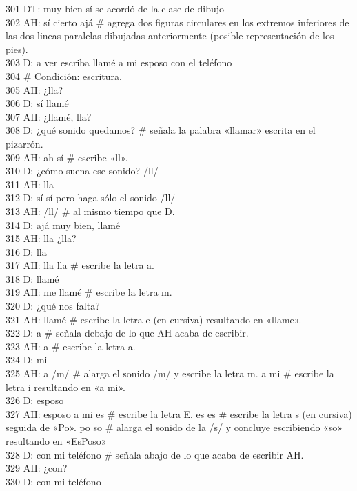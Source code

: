 301 DT: muy bien sí se acordó de la clase de dibujo\\
302 AH: sí cierto ajá \# agrega dos figuras circulares en los extremos inferiores de las dos lineas paralelas dibujadas anteriormente (posible representación de los pies).\\
303 D: a ver escriba llamé a mi esposo con el teléfono\\
304 \# Condición: escritura.\\
305 AH: ¿lla?\\
306 D: sí llamé\\
307 AH: ¿llamé, lla?\\
308 D: ¿qué sonido quedamos? \# señala la palabra «llamar» escrita en el pizarrón.\\
309 AH: ah sí \# escribe «ll».\\
310 D: ¿cómo suena ese sonido? /ll/\\
311 AH: lla\\
312 D: sí sí pero haga sólo el sonido /ll/\\
313 AH: /ll/ \# al mismo tiempo que D.\\
314 D: ajá muy bien, llamé\\
315 AH: lla ¿lla?\\
316 D: lla\\
317 AH: lla lla \# escribe la letra a.\\
318 D: llamé\\
319 AH: me llamé \# escribe la letra m.\\
320 D: ¿qué nos falta?\\
321 AH: llamé \# escribe la letra e (en cursiva) resultando en «llame».\\
322 D: a \# señala debajo de lo que AH acaba de escribir.\\
323 AH: a \# escribe la letra a.\\
324 D: mi\\
325 AH: a /m/ \# alarga el sonido /m/ y escribe la letra m. a mi \# escribe la letra i resultando en «a mi».\\
326 D: esposo\\
327 AH: esposo a mi es \# escribe la letra E. es es \# escribe la letra s (en cursiva) seguida de «Po». po so \# alarga el sonido de la /s/ y concluye escribiendo «so» resultando en «EsPoso»\\
328 D: con mi teléfono \# señala abajo de lo que acaba de escribir AH.\\
329 AH: ¿con?\\
330 D: con mi teléfono\\
